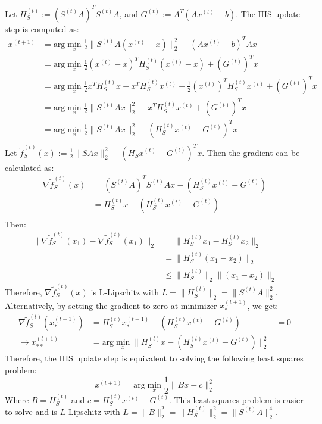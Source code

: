 \documentclass[11pt]{article}
\begin{document}
\noindent Let $H_S^{(t)} := (S^{(t)}A)^TS^{(t)}A$, and $G^{(t)} := A^T(Ax^{(t)}-b)$.
The IHS update step is computed as:
\begin{equation*}
  \begin{aligned}
    x^{(t+1)} &= \text{arg}\min_x \frac{1}{2}\|S^{(t)}A(x^{(t)}-x)\|_2^2 + (Ax^{(t)}-b)^TAx \\
    &= \text{arg}\min_x \frac{1}{2}(x^{(t)}-x)^T H_S^{(t)} (x^{(t)}-x) + (G^{(t)})^Tx \\
    &= \text{arg}\min_x \frac{1}{2}x^TH_S^{(t)}x - x^TH_S^{(t)}x^{(t)} + \frac{1}{2}(x^{(t)})^TH_S^{(t)}x^{(t)} + (G^{(t)})^T x \\
    &= \text{arg}\min_x \frac{1}{2}\|S^{(t)}Ax\|_2^2 - x^TH_S^{(t)}x^{(t)} + (G^{(t)})^T x \\
    &= \text{arg}\min_x \frac{1}{2}\|S^{(t)}Ax\|_2^2 - (H_S^{(t)}x^{(t)} - G^{(t)})^T x \\
  \end{aligned}
\end{equation*}
Let $\tilde{f}_S^{(t)}(x) := \frac{1}{2}\|SAx\|_2^2 - (H_Sx^{(t)} - G^{(t)})^T x$. Then the gradient can be calculated as:
\begin{equation*}
  \begin{aligned}
    \nabla \tilde{f}_S^{(t)}(x) &= (S^{(t)}A)^TS^{(t)}Ax - (H_S^{(t)}x^{(t)} - G^{(t)}) \\
    &= H_S^{(t)}x - (H_S^{(t)}x^{(t)} - G^{(t)}) \\
  \end{aligned}
\end{equation*}
Then:
\begin{equation*}
  \begin{aligned}
    \|\nabla \tilde{f}_S^{(t)}(x_1) -  \nabla \tilde{f}_S^{(t)}(x_1)\|_2
    &= \|H_S^{(t)}x_1 - H_S^{(t)}x_2 \|_2 \\
    &= \|H_S^{(t)}(x_1 - x_2)\|_2 \\
    &\leq \|H_S^{(t)}\|_2\|(x_1 - x_2)\|_2
  \end{aligned}
\end{equation*}
Therefore, $\nabla \tilde{f}_S^{(t)}(x)$ is L-Lipschitz with $L = \|H_S^{(t)}\|_2 = \|S^{(t)}A\|_2^2$.
Alternatively, by setting the gradient to zero at minimizer $x_*^{(t+1)}$, we get:
\begin{equation*}
  \begin{aligned}
    \nabla \tilde{f}_S^{(t)}(x_*^{(t+1)}) &= H_S^{(t)}x_*^{(t+1)} - (H_S^{(t)}x^{(t)} - G^{(t)}) &= 0 \\
    \rightarrow x_{**}^{(t+1)} &= \text{arg}\min_x \|H_S^{(t)}x - (H_S^{(t)}x^{(t)} - G^{(t)})\|_2^2
  \end{aligned}
\end{equation*}
Therefore, the IHS update step is equivalent to solving the following least squares problem:
\begin{equation*}
  x^{(t+1)} = \text{arg}\min_x \frac{1}{2}\|Bx - c\|_2^2
\end{equation*}
Where $B = H_S^{(t)}$ and $c = H_S^{(t)}x^{(t)} - G^{(t)}$.
This least squares problem is easier to solve and is $L$-Lipschitz with $L = \|B\|_2^2 = \|H_S^{(t)}\|_2^2 = \|S^{(t)}A\|_2^4$.
\end{document}

